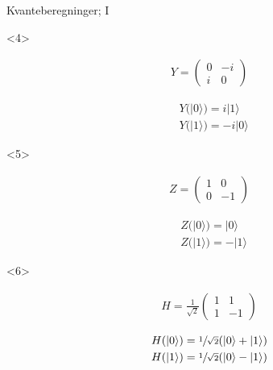 \documentclass[norsk]{beamer}
\begin{document}
\begin{frame}{Kvanteberegninger; I}
\begin{itemize}
			\begin{onlyenv}<4>
				\begin{minipage}{0.25\textwidth}
					\begin{align*}
						Y = \begin{pmatrix*}
							0 & -i \\
							i & 0
						\end{pmatrix*}
					\end{align*}
				\end{minipage}
				\begin{minipage}{0.25\textwidth}
					\begin{align*}
						& Y(|0\rangle) = i|1\rangle \\
						& Y(|1\rangle) = -i|0\rangle
					\end{align*}
				\end{minipage}
			\end{onlyenv}

			\begin{onlyenv}<5>
				\begin{minipage}{0.25\textwidth}
					\begin{align*}
						Z = \begin{pmatrix*}
							1 & 0 \\
							0 & -1
						\end{pmatrix*}
					\end{align*}
				\end{minipage}
				\begin{minipage}{0.25\textwidth}
					\begin{align*}
						& Z(|0\rangle) = |0\rangle \\
						& Z(|1\rangle) = -|1\rangle
					\end{align*}
				\end{minipage}
			\end{onlyenv}

			\begin{onlyenv}<6>
				\begin{minipage}{0.3\textwidth}
					\begin{align*}
						H = \frac{1}{\sqrt{2}}\begin{pmatrix*}
							1 & 1 \\
							1 & -1
						\end{pmatrix*}
					\end{align*}					
				\end{minipage}
				\begin{minipage}{0.3\textwidth}
					\begin{align*}
						& H(|0\rangle) = \sfrac{1}{\sqrt{2}}(|0\rangle + |1\rangle) \\
						& H(|1\rangle) = \sfrac{1}{\sqrt{2}}(|0\rangle - |1\rangle)
					\end{align*}
				\end{minipage}
			\end{onlyenv}


\end{itemize}
\end{frame}
\end{document}
